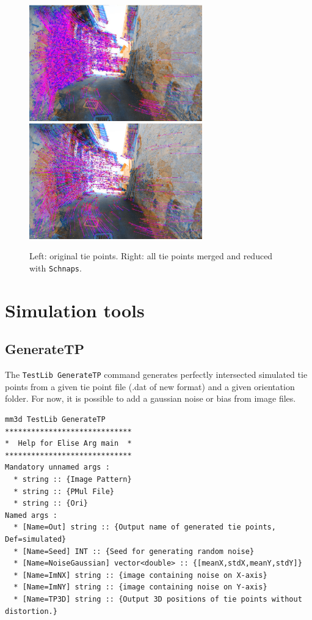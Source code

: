 \begin{figure}[!h]
	\begin{center}
		\includegraphics[width=75mm]{FIGS/StreetSainMartin/rect2.jpg}
		\includegraphics[width=75mm]{FIGS/StreetSainMartin/rect4.jpg}
		\caption{Left: original tie points. Right: all tie points merged and reduced with \texttt{Schnaps}.}
	\end{center}	
\end{figure}

\section{Simulation tools}
\subsection{GenerateTP}
The {\tt TestLib GenerateTP} command generates perfectly intersected simulated tie points from a given tie point file (.dat of new format) and a given orientation folder. For now, it is possible to add a gaussian noise or bias from image files.

\begin{verbatim}
mm3d TestLib GenerateTP
*****************************
*  Help for Elise Arg main  *
*****************************
Mandatory unnamed args : 
  * string :: {Image Pattern}
  * string :: {PMul File}
  * string :: {Ori}
Named args : 
  * [Name=Out] string :: {Output name of generated tie points, Def=simulated}
  * [Name=Seed] INT :: {Seed for generating random noise}
  * [Name=NoiseGaussian] vector<double> :: {[meanX,stdX,meanY,stdY]}
  * [Name=ImNX] string :: {image containing noise on X-axis}
  * [Name=ImNY] string :: {image containing noise on Y-axis}
  * [Name=TP3D] string :: {Output 3D positions of tie points without distortion.}

\end{verbatim}

